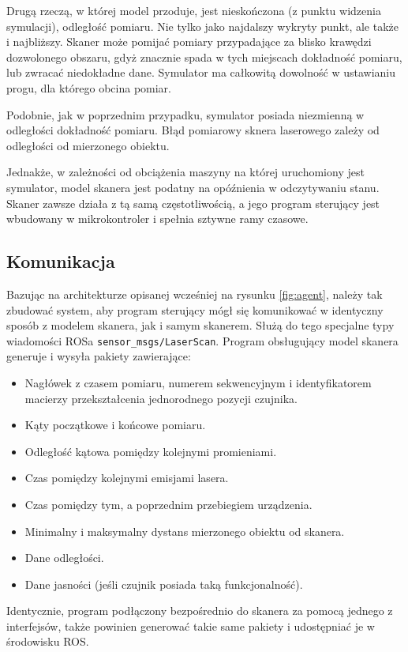 		Drugą rzeczą, w której model przoduje, jest nieskończona (z punktu widzenia symulacji), odległość pomiaru.
		Nie tylko jako najdalszy wykryty punkt, ale także i najbliższy. 
		Skaner może pomijać pomiary przypadające za blisko krawędzi dozwolonego obszaru, gdyż znacznie spada w tych miejscach dokładność pomiaru, lub zwracać niedokładne dane.
		Symulator ma całkowitą dowolność w ustawianiu progu, dla którego obcina pomiar.

		Podobnie, jak w poprzednim przypadku, symulator posiada niezmienną w odległości dokładność pomiaru.
		Błąd pomiarowy sknera laserowego zależy od odległości od mierzonego obiektu.

		Jednakże, w zależności od obciążenia maszyny na której uruchomiony jest symulator, model skanera jest podatny na opóźnienia w odczytywaniu stanu.
		Skaner zawsze działa z tą samą częstotliwością, a jego program sterujący jest wbudowany w mikrokontroler i spełnia sztywne ramy czasowe.

	\subsection{Komunikacja}
		Bazując na architekturze opisanej wcześniej na rysunku \ref{fig:agent}, należy tak zbudować system, aby program sterujący mógł się komunikować w identyczny sposób z 
		modelem skanera, jak i samym skanerem.
		Służą do tego specjalne typy wiadomości ROSa \texttt{sensor\_msgs/LaserScan}.
		Program obsługujący model skanera generuje i wysyła pakiety zawierające:
		\begin{itemize}
			\item Nagłówek z czasem pomiaru, numerem sekwencyjnym i identyfikatorem macierzy przekształcenia jednorodnego pozycji czujnika.
			\item Kąty początkowe i końcowe pomiaru.
			\item Odległość kątowa pomiędzy kolejnymi promieniami.
			\item Czas pomiędzy kolejnymi emisjami lasera.
			\item Czas pomiędzy tym, a poprzednim przebiegiem urządzenia.
			\item Minimalny i maksymalny dystans mierzonego obiektu od skanera.
			\item Dane odległości.
			\item Dane jasności (jeśli czujnik posiada taką funkcjonalność).
		\end{itemize}

		Identycznie, program podłączony bezpośrednio do skanera za pomocą jednego z interfejsów, także powinien generować takie same pakiety i udostępniać je w środowisku ROS.
		
